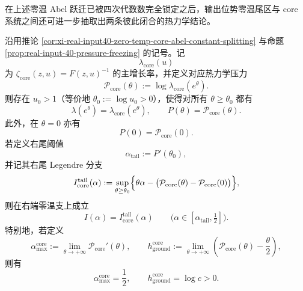在上述零温 Abel 跃迁已被四次代数数完全锁定之后，输出位势零温尾区与 core 系统之间还可进一步抽取出两条彼此闭合的热力学结论。

\begin{theorem}\label{thm:xi-real-input40-core-thermodynamic-tail-equivalence}
沿用推论 \ref{cor:xi-real-input40-zero-temp-core-abel-constant-splitting} 与命题
\ref{prop:real-input-40-pressure-freezing} 的记号。记
\[
\lambda_{\mathrm{core}}(u)
\]
为 \(\zeta_{\mathrm{core}}(z,u)=F(z,u)^{-1}\) 的主增长率，并定义对应热力学压力
\[
\mathcal P_{\mathrm{core}}(\theta):=\log \lambda_{\mathrm{core}}(e^\theta).
\]
则存在 \(u_0>1\)（等价地 \(\theta_0:=\log u_0>0\)），使得对所有 \(\theta\ge \theta_0\) 都有
\[
\boxed{\;
\lambda(e^\theta)=\lambda_{\mathrm{core}}(e^\theta),
\qquad
P(\theta)=\mathcal P_{\mathrm{core}}(\theta).\;}
\]
此外，在 \(\theta=0\) 亦有
\[
P(0)=\mathcal P_{\mathrm{core}}(0).
\]
若定义右尾阈值
\[
\alpha_{\mathrm{tail}}:=P'(\theta_0),
\]
并记其右尾 Legendre 分支
\[
I_{\mathrm{core}}^{\mathrm{tail}}(\alpha):=
\sup_{\theta\ge \theta_0}
\Bigl\{\theta\alpha-\bigl(\mathcal P_{\mathrm{core}}(\theta)-\mathcal P_{\mathrm{core}}(0)\bigr)\Bigr\},
\]
则在右端零温支上成立
\[
\boxed{\;
I(\alpha)=I_{\mathrm{core}}^{\mathrm{tail}}(\alpha)
\qquad
\bigl(\alpha\in[\alpha_{\mathrm{tail}},\tfrac12]\bigr).\;}
\]
特别地，若定义
\[
\alpha_{\max}^{\mathrm{core}}
:=
\lim_{\theta\to+\infty}\mathcal P_{\mathrm{core}}'(\theta),
\qquad
h_{\mathrm{ground}}^{\mathrm{core}}
:=
\lim_{\theta\to+\infty}\left(\mathcal P_{\mathrm{core}}(\theta)-\frac{\theta}{2}\right),
\]
则有
\[
\boxed{\;
\alpha_{\max}^{\mathrm{core}}=\frac12,
\qquad
h_{\mathrm{ground}}^{\mathrm{core}}=\log c>0.\;}
\]
\end{theorem}
